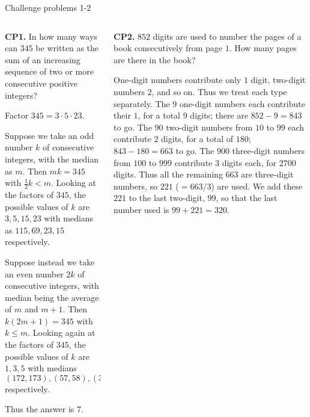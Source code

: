 \documentclass[9pt,aspectratio=169]{beamer}
\begin{document}
\begin{frame}{Challenge problems 1-2}
  \begin{columns}[T]
    \begin{column}{0.5\textwidth}
      \begin{problem}
        \textbf{CP1.} In how many ways can $345$ be written as the sum of an increasing sequence of two or more consecutive positive integers?
      \end{problem}
      Factor $345=3\cdot 5\cdot 23$.

      Suppose we take an odd number $k$ of consecutive integers, with the median as $m$. Then $mk=345$ with $\tfrac12k<m$. Looking at the factors of $345$, the possible values of $k$ are $3,5,15,23$ with medians as $115,69,23,15$ respectively.

      Suppose instead we take an even number $2k$ of consecutive integers, with median being the average of $m$ and $m+1$. Then $k(2m+1)=345$ with $k\le m$. Looking again at the factors of $345$, the possible values of $k$ are $1,3,5$ with medians $(172,173),(57,58),(34,35)$ respectively.

      Thus the answer is $\boxed{7}$.
    \end{column}
    \begin{column}{0.5\textwidth}
      \begin{problem}
        \textbf{CP2.} $852$ digits are used to number the pages of a book consecutively from page $1$. How many pages
        are there in the book?
      \end{problem}
      One-digit numbers contribute only $1$ digit, two-digit numbers $2$, and so on. Thus we treat each type separately. The $9$ one-digit numbers each contribute their $1$, for a total $9$ digits; there are $852 - 9 = 843$ to go. The $90$ two-digit numbers from $10$ to $99$ each contribute $2$ digits, for a total of $180$; $843 - 180 = 663$ to go. The $900$ three-digit numbers from $100$ to $999$ contribute $3$ digits each, for $2700$ digits. Thus all the remaining $663$ are three-digit numbers, so $221$ ($=663/3$) are used. We add these $221$ to the last two-digit, $99$, so that the last number used is $99 + 221 = \boxed{320}$.  
    \end{column}
  \end{columns}
\end{frame}
\end{document}
